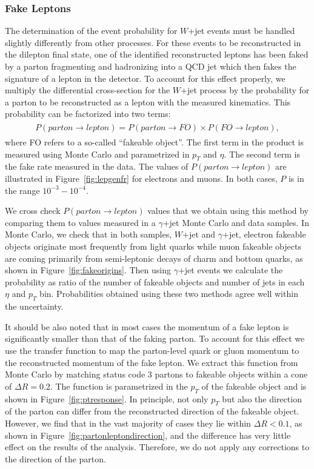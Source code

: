 \documentclass{cmspaper}
\begin{document}
\subsubsection{Fake Leptons}
\label{sec:FakeLeptons}
The determination of the event probability for $W$+jet events must be handled slightly differently from other processes.
For these events to be reconstructed in the dilepton final state, one of the identified reconstructed leptons has been
faked by a parton fragmenting and hadronizing into a QCD jet which then fakes the signature of a lepton in the detector. 
To account for this effect properly, we multiply the differential cross-section for the $W$+jet process by the 
probability for a parton to be reconstructed as a lepton with the measured kinematics. This probability can be 
factorized into two terms:
\begin{eqnarray}
\begin{array}{lcl}
P(parton\rightarrow lepton)=P(parton\rightarrow FO) \times P(FO\rightarrow lepton),
\end{array} 
\end{eqnarray} 
where FO refers to a so-called ``fakeable object''. The first term in the product is measured using Monte Carlo and 
parametrized in $p_{T}$ and $\eta$. The second term is the fake rate measured in the data. The values 
of $P(parton \rightarrow lepton)$ are illustrated in Figure~\ref{fig:lepgenfr} for electrons and muons.
In both cases, $P$ is in the range $10^{-3}-10^{-4}$.

We cross check $P(parton \rightarrow lepton)$ values that we obtain using this method by comparing them to values 
measured in a $\gamma$+jet Monte Carlo and data samples.  In Monte Carlo, we check that in both samples, $W$+jet and  $\gamma$+jet,
electron fakeable objects originate most frequently from light quarks while muon fakeable objects are coming primarily
from semi-leptonic decays of charm and bottom quarks, as shown in Figure~\ref{fig:fakeorigins}.
Then using  $\gamma$+jet events we calculate the probability as ratio of the number of fakeable objects and number of jets in each $\eta$ and $p_{T}$ bin.
Probabilities obtained using these two methods agree well within the uncertainty. 

It should be also noted that in most cases the momentum of a fake lepton is significantly smaller than that of the faking parton.
To account for this effect we use the transfer function to map the parton-level quark or gluon momentum to the reconstructed
momentum of the fake lepton.
We extract this function from Monte Carlo by matching status code 3 partons to fakeable objects within a
cone of $\Delta R=0.2$.
The function is parametrized in the $p_{T}$ of the fakeable object and is shown in Figure~\ref{fig:ptresponse}.
In principle, not only $p_{T}$ but also the direction of the parton can differ from the reconstructed direction of the fakeable object.
However, we find that in the vast majority of cases they lie within $\Delta R<0.1$, as shown in Figure~\ref{fig:partonleptondirection},
and the difference has very little effect on the results of the analysis. Therefore, we do not apply any corrections to the direction
of the parton.
\end{document}

